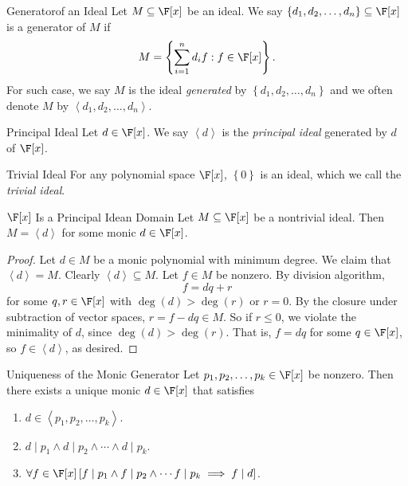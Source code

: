 \documentclass[linearalgebraII]{subfiles}
\begin{document}
    \begin{definition}{Generator}{of an Ideal}
        Let $M\subseteq \F[x]$ be an ideal. We say $\left\lbrace d_1, d_2, \ldots, d_n \right\rbrace \subseteq \F[x]$ is a generator of $M$ if
        \begin{equation*}
            M = \left\lbrace \sum^{n}_{i=1} d_if : f\in \F[x] \right\rbrace.
        \end{equation*}
        For such case, we say $M$ is the ideal \emph{generated} by $\left\lbrace d_1, d_2, \ldots, d_n \right\rbrace$ and we often denote $M$ by $\left< d_1, d_2, \ldots, d_n \right>$.
    \end{definition}

    \begin{definition}{Principal Ideal}{}
        Let $d\in \F[x]$. We say $\left<d\right>$ is the \emph{principal ideal} generated by $d$ of $\F[x]$.
    \end{definition}

    \begin{definition}{Trivial Ideal}{}
        For any polynomial space $\F[x]$, $\left\lbrace 0 \right\rbrace$ is an ideal, which we call the \emph{trivial ideal}.
    \end{definition}

    \begin{prop}{$\F[x]$ Is a Principal Idean Domain}
        Let $M\subseteq \F[x]$ be a nontrivial ideal. Then $M = \left<d\right>$ for some monic $d\in \F[x]$.
    \end{prop}

    \begin{proof}
        Let $d\in M$ be a monic polynomial with minimum degree. We claim that $\left< d \right> = M$. Clearly $\left< d \right> \subseteq M$. Let $f\in M$ be nonzero. By division algorithm,
        \begin{equation*}
            f = dq+r
        \end{equation*}
        for some $q,r\in \F[x]$ with $\deg(d) > \deg(r)$ or $r = 0$. By the closure under subtraction of vector spaces, $r = f-dq\in M$. So if $r\leq 0$, we violate the minimality of $d$, since $\deg(d) > \deg(r)$. That is, $f = dq$ for some $q\in \F[x]$, so $f\in \left< d \right>$, as desired. 
    \end{proof}

    \begin{cor}{Uniqueness of the Monic Generator}
        Let $p_1, p_2, \ldots, p_k\in \F[x]$ be nonzero. Then there exists a unique monic $d\in \F[x]$ that satisfies
        \begin{enumerate}
            \item $d\in \left< p_1, p_2, \ldots, p_k \right>$.  
            \item $d\mid p_1\land d\mid p_2\land \cdots \land d\mid p_k$.
            \item $\forall f\in \F[x] \left[ f\mid p_1\land f\mid p_2\land \cdots f\mid p_k \implies f\mid d \right]$. 
        \end{enumerate}
    \end{cor}	
\end{document}

